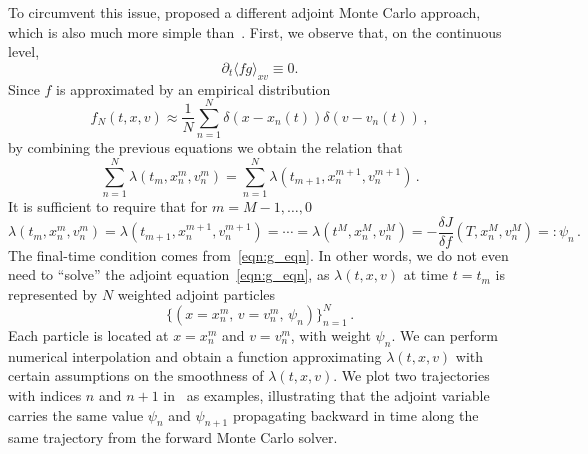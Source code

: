 \documentclass[12pt]{amsart}
\newcommand{\average}[1]{ \langle#1 \rangle}
\begin{document}
To circumvent this issue, \cite{li2022monte} proposed a different adjoint Monte Carlo approach, which is also much more simple than~. First, we observe that, on the continuous level, 
\[
\partial_t \average{fg}_{xv} \equiv 0.
\]
Since $f$ is approximated by an empirical distribution 
\begin{equation}\label{eq:f_N}
f_N(t,x,v) \approx \frac{1}{N}\sum_{n=1}^N \delta\left(x- {x_n(t)} \right) \delta\left(v- {v_n(t)} \right)\,,
\end{equation}
by combining the previous equations we obtain the relation that
\[
    \sum_{n=1}^N \lambda(t_m, x_n^m, v_n^m) =    \sum_{n=1}^N \lambda( t_{m+1},x_n^{m+1}, v_n^{m+1})\,.
\]
It is sufficient to require that for $m= M-1,\ldots,0$
\[
\lambda(t_m, x_n^m, v_n^m)  = \lambda(t_{m+1}, x_n^{m+1}, v_n^{m+1}) =\cdots =\lambda(t^{M}, x_n^{M}, v_n^{M}) = -\frac{\delta J}{\delta f}(T,x_n^M,v_n^M)=:\psi_n \,.
\]
The final-time condition comes from~\eqref{eqn:g_eqn}. In other words, we do not even need to ``solve'' the adjoint equation~\eqref{eqn:g_eqn}, as $\lambda(t,x,v)$  at time $t=t_m$ is represented by $N$ weighted adjoint particles
\begin{equation}\label{eq:rte_adj_MC}
\{\left( x=x_n^m,\, v=v_n^m, \, \psi_n \right)\}_{n=1}^N\,.
\end{equation}
Each particle is located at $x=x_n^m$ and  $v=v_n^m$, with weight $\psi_n$.
We can perform numerical interpolation and obtain a function approximating $\lambda(t,x,v)$ with certain assumptions on the smoothness of $\lambda(t,x,v)$. We plot two trajectories with indices $n$ and $n+1$ in~ as examples, illustrating that the adjoint variable carries the same value $\psi_n$ and $\psi_{n+1}$ propagating backward in time along the same trajectory from the forward Monte Carlo solver.
\end{document}
